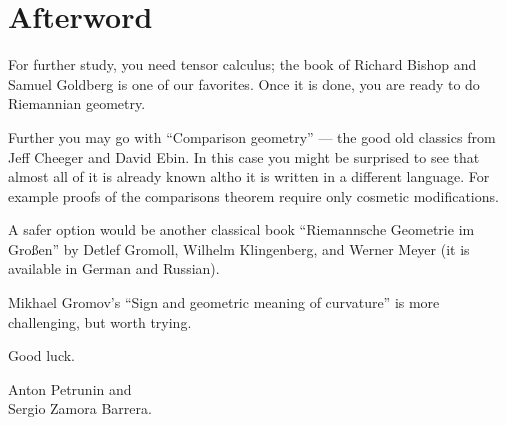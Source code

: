 \chapter*{Afterword}



For further study, you need tensor calculus; the book of Richard Bishop and Samuel Goldberg \cite{bishop-goldberg} is one of our favorites.
Once it is done, you are ready to do Riemannian geometry.

Further you may go with  ``Comparison geometry'' \cite{cheeger-ebin} --- the good old classics from Jeff Cheeger and David Ebin. 
In this case you might be surprised to see that almost all of it is already known altho it is written in a different language.
For example proofs of the comparisons theorem require only cosmetic modifications.

A safer option would be another classical book ``Riemannsche Geometrie im Großen'' \cite{gromoll-klingenberg-meyer} by 
Detlef Gromoll,
Wilhelm Klingenberg, 
and  Werner Meyer (it is available in German and Russian).

Mikhael Gromov's ``Sign and geometric meaning of curvature'' \cite{gromov-1991} is more challenging, but worth trying.

Good luck.

\begin{flushright}
Anton Petrunin and\\
Sergio Zamora Barrera.
\end{flushright}
